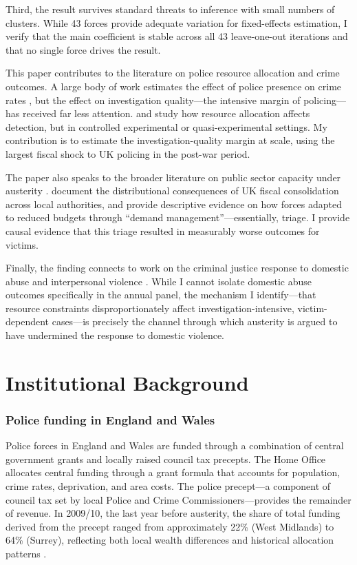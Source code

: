 \documentclass[12pt]{article}
\begin{document}
Third, the result survives standard threats to inference with small numbers of clusters. While 43 forces provide adequate variation for fixed-effects estimation, I verify that the main coefficient is stable across all 43 leave-one-out iterations and that no single force drives the result.

This paper contributes to the literature on police resource allocation and crime outcomes. A large body of work estimates the effect of police presence on crime rates \citep{levitt1997,chalfin2018,mello2019}, but the effect on investigation quality---the intensive margin of policing---has received far less attention. \citet{blanes2020} and \citet{mastrobuoni2020} study how resource allocation affects detection, but in controlled experimental or quasi-experimental settings. My contribution is to estimate the investigation-quality margin at scale, using the largest fiscal shock to UK policing in the post-war period.

The paper also speaks to the broader literature on public sector capacity under austerity \citep{fetzer2019}. \citet{beatty2014} document the distributional consequences of UK fiscal consolidation across local authorities, and \citet{innes2019} provide descriptive evidence on how forces adapted to reduced budgets through ``demand management''---essentially, triage. I provide causal evidence that this triage resulted in measurably worse outcomes for victims.

Finally, the finding connects to work on the criminal justice response to domestic abuse and interpersonal violence \citep{hester2006,robinson2016,hmicfrs2019}. While I cannot isolate domestic abuse outcomes specifically in the annual panel, the mechanism I identify---that resource constraints disproportionately affect investigation-intensive, victim-dependent cases---is precisely the channel through which austerity is argued to have undermined the response to domestic violence.

\section{Institutional Background}

\subsubsection*{Police funding in England and Wales}  Police forces in England and Wales are funded through a combination of central government grants and locally raised council tax precepts. The Home Office allocates central funding through a grant formula that accounts for population, crime rates, deprivation, and area costs. The police precept---a component of council tax set by local Police and Crime Commissioners---provides the remainder of revenue. In 2009/10, the last year before austerity, the share of total funding derived from the precept ranged from approximately 22\% (West Midlands) to 64\% (Surrey), reflecting both local wealth differences and historical allocation patterns \citep{nao2015}.
\end{document}
